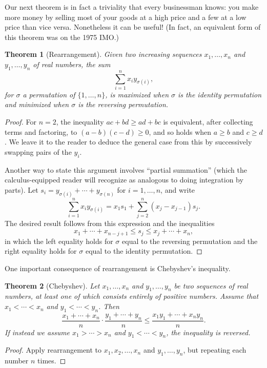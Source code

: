 \documentclass[12pt]{report}
\newtheorem{theorem}{Theorem}
\numberwithin{exc}{section}
\begin{document}
Our next theorem is in fact a triviality that every businessman 
knows: you make more money by selling most of your goods at a high 
price and a few at a low price than vice versa. Nonetheless it can be 
useful! (In fact, an equivalent form of this theorem was on the 1975 IMO.)
\begin{theorem}[Rearrangement]
Given two increasing sequences $x_{1}, \dots, x_{n}$ and $y_{1}, \dots, y_{n}$ of 
real numbers, the sum
\[
\sum_{i=1}^{n} x_{i}y_{\sigma(i)},
\]
for $\sigma$ a permutation of $\{1, \dots, n\}$, is maximized when 
$\sigma$ is the identity permutation and minimized when $\sigma$ is 
the reversing permutation.
\end{theorem}
\begin{proof}
For $n=2$, the inequality $ac + bd \geq ad + bc$ is equivalent, after
collecting terms and factoring, to $(a-b)(c-d) \geq 0$, and so holds
when $a \geq b$ and $c \geq d$. 
We leave it to the reader to deduce the general case from this by
successively swapping pairs of the $y_i$.

Another way to state this argument involves ``partial summation'' (which the 
calculus-equipped reader will recognize as analogous to doing 
integration by parts). Let $s_i = y_{\sigma(i)} + \cdots + 
y_{\sigma(n)}$ for $i = 1, \dots, n$, and write
\[
\sum_{i=1}^n x_i y_{\sigma(i)}
= x_1 s_1 + \sum_{j=2}^n (x_j - x_{j-1}) s_j.
\]
The desired result follows from this expression and the inequalities
\[
x_1 + \cdots + x_{n-j+1} \leq s_j \leq x_j + \cdots + x_n,
\]
in which the left equality holds for $\sigma$ equal to the reversing 
permutation and the right equality holds for $\sigma$ equal to the 
identity permutation.
\end{proof}

One important consequence of rearrangement is Chebyshev's inequality.
\begin{theorem}[Chebyshev]
Let $x_{1}, \dots, x_{n}$ and $y_{1}, \dots, y_{n}$ be two sequences 
of real numbers, at least one of which consists entirely of positive 
numbers. Assume that $x_{1} < \cdots < x_{n}$ and $y_{1} < \cdots < 
y_{n}$. Then
\[
\frac{x_{1} + \cdots + x_{n}}{n} \cdot
\frac{y_{1} + \cdots + y_{n}}{n} \leq \frac{x_{1}y_{1} + \cdots + 
x_{n}y_{n}}{n}.
\]
If instead we assume $x_{1} > \cdots > x_{n}$ and $y_{1} < \cdots < 
y_{n}$, the inequality is reversed.
\end{theorem}
\begin{proof}
Apply rearrangement to $x_1, x_2, \dots, x_n$ and $y_1, \dots, y_n$, 
but repeating each number $n$ times.
\end{proof}
\end{document}
